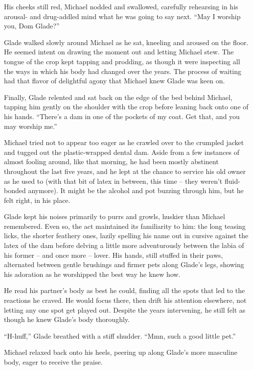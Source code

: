 His cheeks still red, Michael nodded and swallowed, carefully rehearsing in his arousal- and drug-addled mind what he was going to say next. ``May I worship you, Dom Glade?''

Glade walked slowly around Michael as he sat, kneeling and aroused on the floor. He seemed intent on drawing the moment out and letting Michael stew. The tongue of the crop kept tapping and prodding, as though it were inspecting all the ways in which his body had changed over the years. The process of waiting had that flavor of delightful agony that Michael knew Glade was keen on.

Finally, Glade relented and sat back on the edge of the bed behind Michael, tapping him gently on the shoulder with the crop before leaning back onto one of his hands. ``There's a dam in one of the pockets of my coat. Get that, and you may worship me.''

Michael tried not to appear too eager as he crawled over to the crumpled jacket and tugged out the plastic-wrapped dental dam. Aside from a few instances of almost fooling around, like that morning, he had been mostly abstinent throughout the last five years, and he lept at the chance to service his old owner as he used to (with that bit of latex in between, this time -- they weren't fluid-bonded anymore). It might be the alcohol and pot buzzing through him, but he felt right, in his place.

Glade kept his noises primarily to purrs and growls, huskier than Michael remembered. Even so, the act maintained its familiarity to him: the long teasing licks, the shorter feathery ones, lazily spelling his name out in cursive against the latex of the dam before delving a little more adventurously between the labia of his former -- and once more -- lover. His hands, still stuffed in their paws, alternated between gentle brushings and firmer pets along Glade's legs, showing his adoration as he worshipped the best way he knew how.

He read his partner's body as best he could, finding all the spots that led to the reactions he craved. He would focus there, then drift his attention elsewhere, not letting any one spot get played out. Despite the years intervening, he still felt as though he knew Glade's body thoroughly.

``H-huff,'' Glade breathed with a stiff shudder. ``Mmn, such a good little pet.''

Michael relaxed back onto his heels, peering up along Glade's more masculine body, eager to receive the praise.

